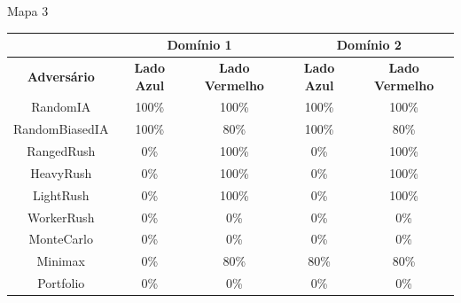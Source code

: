 \documentclass{beamer}
\begin{document}
\begin{frame}{Mapa 3}
	
	{\footnotesize
			\begin{tabular}{|c|cc|cc|}
				\hline
				\textbf{}           & \multicolumn{2}{c|}{\textbf{Domínio 1}}  & \multicolumn{2}{c|}{\textbf{Domínio 2}}  \\ \hline
				\textbf{Adversário} & \textbf{Lado Azul} & \textbf{Lado Vermelho} & \textbf{Lado Azul} & \textbf{Lado Vermelho} \\ \hline
				RandomIA            & 100\%              & 100\%                  & 100\%              & 100\%                  \\ \hline
				RandomBiasedIA      & 100\%              & 80\%                   & 100\%              & 80\%                   \\ \hline
				RangedRush          & 0\%                & 100\%                  & 0\%                & 100\%                  \\ \hline
				HeavyRush           & 0\%                & 100\%                  & 0\%                & 100\%                  \\ \hline
				LightRush           & 0\%                & 100\%                  & 0\%                & 100\%                  \\ \hline
				WorkerRush          & 0\%                & 0\%                    & 0\%                & 0\%                    \\ \hline
				MonteCarlo          & 0\%                & 0\%                    & 0\%                & 0\%                    \\ \hline
				Minimax             & 0\%                & 80\%                  & 80\%              & 80\%                   \\ \hline
				Portfolio           & 0\%                & 0\%                    & 0\%                & 0\%                    \\ \hline
			\end{tabular}
	}
\end{frame}
\end{document}
